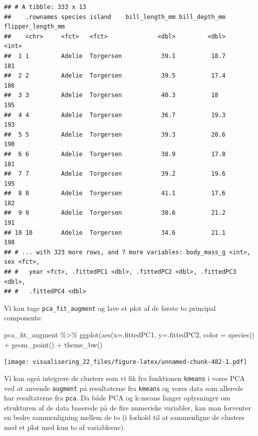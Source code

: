 \documentclass[
]{book}
\newenvironment{Shaded}{\begin{snugshade}}{\end{snugshade}}
\newcommand{\AttributeTok}[1]{\textcolor[rgb]{0.77,0.63,0.00}{#1}}
\newcommand{\FunctionTok}[1]{\textcolor[rgb]{0.00,0.00,0.00}{#1}}
\newcommand{\NormalTok}[1]{#1}
\newcommand{\SpecialCharTok}[1]{\textcolor[rgb]{0.00,0.00,0.00}{#1}}
\begin{document}
\begin{verbatim}
## # A tibble: 333 x 13
##    .rownames species island    bill_length_mm bill_depth_mm flipper_length_mm
##    <chr>     <fct>   <fct>              <dbl>         <dbl>             <int>
##  1 1         Adelie  Torgersen           39.1          18.7               181
##  2 2         Adelie  Torgersen           39.5          17.4               186
##  3 3         Adelie  Torgersen           40.3          18                 195
##  4 4         Adelie  Torgersen           36.7          19.3               193
##  5 5         Adelie  Torgersen           39.3          20.6               190
##  6 6         Adelie  Torgersen           38.9          17.8               181
##  7 7         Adelie  Torgersen           39.2          19.6               195
##  8 8         Adelie  Torgersen           41.1          17.6               182
##  9 9         Adelie  Torgersen           38.6          21.2               191
## 10 10        Adelie  Torgersen           34.6          21.1               198
## # ... with 323 more rows, and 7 more variables: body_mass_g <int>, sex <fct>,
## #   year <fct>, .fittedPC1 <dbl>, .fittedPC2 <dbl>, .fittedPC3 <dbl>,
## #   .fittedPC4 <dbl>
\end{verbatim}

Vi kan tage \texttt{pca\_fit\_augment} og lave et plot af de første to principal components:

\begin{Shaded}
\begin{Highlighting}[]
\NormalTok{pca\_fit\_augment  }\SpecialCharTok{\%\textgreater{}\%} 
  \FunctionTok{ggplot}\NormalTok{(}\FunctionTok{aes}\NormalTok{(}\AttributeTok{x=}\NormalTok{.fittedPC1, }\AttributeTok{y=}\NormalTok{.fittedPC2, }\AttributeTok{color =}\NormalTok{ species)) }\SpecialCharTok{+} 
  \FunctionTok{geom\_point}\NormalTok{() }\SpecialCharTok{+}
  \FunctionTok{theme\_bw}\NormalTok{()}
\end{Highlighting}
\end{Shaded}

\texttt{[image: visualisering\_22\_files/figure-latex/unnamed-chunk-482-1.pdf]}

Vi kan også integrere de clusters som vi fik fra funktionen \texttt{kmeans} i vores PCA ved at anvende \texttt{augment} på resultaterne fra \texttt{kmeans} og vores data som allerede har resultaterne fra \texttt{pca}. Da både PCA og k-means fanger oplysninger om strukturen af de data baserede på de fire numeriske variabler, kan man forventer en bedre sammenligning mellem de to (i forhold til at sammenligne de clusters med et plot med kun to af variablerne).
\end{document}
